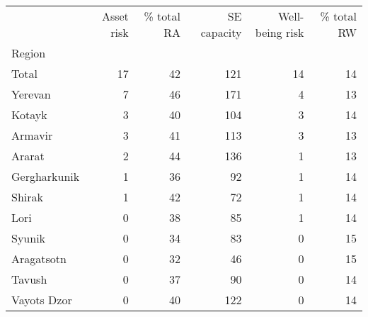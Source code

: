 \begin{tabular}{lrrrrr}
\toprule
{} &  Asset risk &  \% total RA &  SE capacity &  Well-being risk &  \% total RW \\
Region       &             &             &              &                  &             \\
\midrule
Total        &          17 &          42 &          121 &               14 &          14 \\
Yerevan      &           7 &          46 &          171 &                4 &          13 \\
Kotayk       &           3 &          40 &          104 &                3 &          14 \\
Armavir      &           3 &          41 &          113 &                3 &          13 \\
Ararat       &           2 &          44 &          136 &                1 &          13 \\
Gergharkunik &           1 &          36 &           92 &                1 &          14 \\
Shirak       &           1 &          42 &           72 &                1 &          14 \\
Lori         &           0 &          38 &           85 &                1 &          14 \\
Syunik       &           0 &          34 &           83 &                0 &          15 \\
Aragatsotn   &           0 &          32 &           46 &                0 &          15 \\
Tavush       &           0 &          37 &           90 &                0 &          14 \\
Vayots Dzor  &           0 &          40 &          122 &                0 &          14 \\
\bottomrule
\end{tabular}
